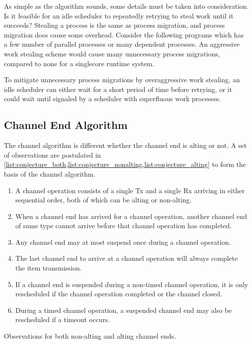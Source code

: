 As simple as the algorithm sounds, some details must be taken into consideration. Is it feasible for an idle scheduler to repeatedly retrying to steal work until it succeeds? Stealing a process is the same as process migration, and process migration does cause some overhead. Consider the following programs which has a few number of parallel processes or many dependent processes. An aggressive work stealing scheme would cause many unnecessary process migrations, compared to none for a singlecore runtime system. 

To mitigate unnecessary process migrations by overaggressive work stealing, an idle scheduler can either wait for a short period of time before retrying, or it could wait until signaled by a scheduler with superfluous work processes. 


\subsection{Channel End Algorithm}
\label{subsec:channel_end_algorithm}


The channel algorithm is different whether the channel end is alting or not. A set of observations are postulated in \cref{list:conjecture_both,list:conjecture_nonalting,list:conjecture_alting} to form the basis of the channel algorithm.

\FloatBarrier

\begin{enumeratefloat}
    \begin{enumerate}[topsep=0em,itemsep=-1em,partopsep=0.5em,parsep=1em]
        \item A channel operation consists of a single Tx and a single Rx arriving in either sequential order, both of which can be alting or non\hyp{}alting.
        \item When a channel end has arrived for a channel operation, another channel end of same type cannot arrive before that channel operation has completed.
        \item Any channel end may at most suspend once during a channel operation.
        \item The last channel end to arrive at a channel operation will always complete the item transmission.
        \item If a channel end is suspended during a non\hyp{}timed channel operation, it is only rescheduled if the channel operation completed or the channel closed.
        \item During a timed channel operation, a suspended channel end may also be rescheduled if a timeout occurs.
    \end{enumerate}
    \caption{Observations for both non\hyp{}alting and alting channel ends.}
    \label{list:conjecture_both}
\end{enumeratefloat}

